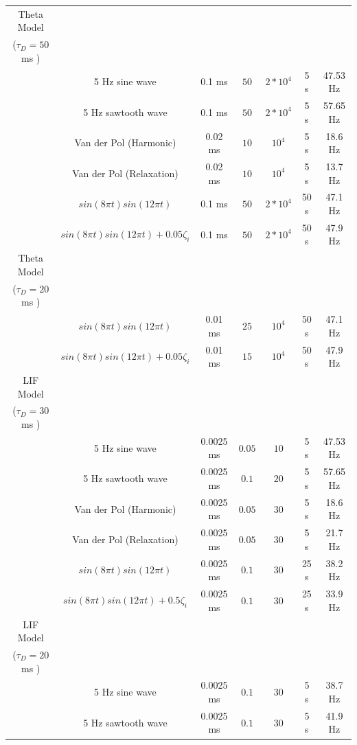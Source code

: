 \documentclass[11pt]{article} %
\begin{document}
\begin{table}
\begin{center}
\begin{tabular}{ | c | c | c | c | c | c | c | }
\hline 
\hline
Theta Model  & & & & & & \\
($\tau_D = 50$ ms )  & & & & & & \\
\hline
 & 5 Hz sine wave & 0.1 ms &  $50$ & $2*10^4$  & 5 s &  47.53 Hz  \\  
\hline   & 5 Hz sawtooth wave & 0.1 ms  & $50$ & $2*10^4$ & 5 s & 57.65 Hz \\  
\hline 
  & Van der Pol (Harmonic) & 0.02 ms & $10$ & $10^4$ & 5 s & 18.6 Hz \\  
\hline 
   & Van der Pol (Relaxation) & 0.02 ms & $10 $ & $10^4$ & 5 s & 13.7 Hz \\  
\hline 
 & $sin(8\pi t)sin(12\pi t)$ & 0.1 ms & $50$ & $2*10^4$ & 50 s & 47.1 Hz \\  
\hline 
 & $sin(8\pi t)sin(12\pi t) + 0.05 \zeta_i$ & 0.1 ms & $50$ & $2*10^4$ & 50 s & 47.9 Hz \\
\hline 
\hline
Theta Model  & & & & & & \\
($\tau_D = 20$ ms )  & & & & & & \\
\hline
 & $sin(8\pi t)sin(12\pi t)$ & 0.01 ms & $25$ & $10^4$ & 50 s & 47.1 Hz \\  
\hline  
 & $sin(8\pi t)sin(12\pi t) + 0.05 \zeta_i$ & 0.01 ms & $15$ & $10^4$ & 50 s & 47.9 Hz \\
\hline 
\hline
LIF Model  & & & & & & \\
($\tau_D = 30$ ms )  & & & & & & \\
\hline
    & 5 Hz sine wave & 0.0025 ms &  $0.05$ & $10$  & 5 s &  47.53 Hz  \\  
\hline 
 & 5 Hz sawtooth wave & 0.0025 ms  & $0.1$ & $20$ & 5 s & 57.65 Hz \\  
\hline 
   & Van der Pol (Harmonic) & 0.0025 ms & $0.05$ & $30$ & 5 s & 18.6 Hz \\  
\hline 
  & Van der Pol (Relaxation) & 0.0025 ms & $0.05 $ & $30$ & 5 s & 21.7 Hz \\  
\hline 
  & $sin(8\pi t)sin(12\pi t)$ & 0.0025 ms & $0.1$ & $30$ & 25 s & 38.2 Hz \\  
\hline   & $sin(8\pi t)sin(12\pi t) + 0.5 \zeta_i$ & 0.0025 ms & $0.1$ & $30 $ & 25 s & 33.9 Hz \\
\hline 
\hline
LIF Model  & & & & & & \\
($\tau_D = 20$ ms )  & & & & & & \\
\hline
  & 5 Hz sine wave & 0.0025 ms &  $0.1$ & $30$  & 5 s &  38.7 Hz  \\  
\hline 
& 5 Hz sawtooth wave & 0.0025 ms  & $0.1$ & $30$ & 5 s & 41.9 Hz \\  

\end{tabular}
\end{center}
\end{table}
\end{document}
